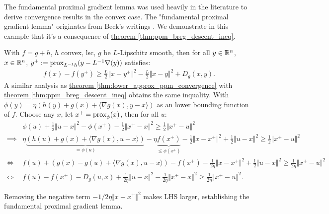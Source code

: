\documentclass[12pt]{article}
\begin{document}
        \begin{example}
            The fundamental proximal gradient lemma was used heavily in the literature to derive convergence results in the convex case. 
            The "fundamental proximal gradient lemma" originates from Beck's writings \cite[theorem 10.16]{beck_first-order_nodate}. 
            We demonstrate in this example that it's a consequence of \hyperref[thm:ppm_breg_descent_ineq]{theorem \ref*{thm:ppm_breg_descent_ineq}}. 
            \par
            With $f = g + h$, $h$ convex, lsc, $g$ be $L$-Lipschitz smooth, then for all $y\in \mathbb R^n$, $x\in \mathbb R^n$, $y^+ := \operatorname{prox}_{L^{-1}h}(y - L^{-1}\nabla (y))$ satisfies: 
            \begin{align*}
                f(x) - f(y^+) \ge \frac{L}{2}\Vert x - y^+\Vert^2 - \frac{L}{2}\Vert x - y\Vert^2 + D_g(x, y).
            \end{align*}
            A similar analysis as \hyperref[thm:lower_approx_ppm_convergence]{ theorem \ref*{thm:lower_approx_ppm_convergence}} with \hyperref[thm:ppm_breg_descent_ineq]{theorem \ref*{thm:ppm_breg_descent_ineq}} obtains the same inquality. 
            With $\phi(y) = \eta(h(y) + g(x) + \langle \nabla g(x), y - x\rangle)$ as an lower bounding function of $f$. 
            Choose any $x$, let $x^+ = \operatorname{prox}_\phi(x)$, then for all $u$:
            {\small
            \begin{align*}
                & \phi(u) + \frac{1}{2}\Vert u - x\Vert^2 - \phi(x^+) - \frac{1}{2}\Vert x^+ - x\Vert^2 
                \ge \frac{1}{2}\Vert x^+ - u\Vert^2
                \\
                \implies &
                \eta\underbrace{
                    \left(
                        h(u) + g(x) + \langle \nabla g(x), u - x\rangle 
                    \right)
                }_{= \phi(u)} 
                - \eta \underbrace{f(x^+)}_{\le \phi(x^+)} - \frac{1}{2}\Vert x - x^+\Vert^2 
                + \frac{1}{2} \Vert u - x\Vert^2 
                \ge 
                \frac{1}{2}\Vert x^+ - u\Vert^2 
                \\
                \iff & 
                f(u) + \left(
                    g(x) - g(u) + \langle \nabla g(x), u -x\rangle 
                \right)
                - f(x^+) - \frac{1}{2\eta}\Vert x - x^+\Vert^2
                + 
                \frac{1}{2}\Vert u - x\Vert^2 
                \ge 
                \frac{1}{2\eta}\Vert x^+ - u\Vert^2 
                \\
                \iff 
                & f(u) - f(x^+) - D_g(u, x)
                + \frac{1}{2\eta} \Vert u - x\Vert^2 - \frac{1}{2\eta}\Vert x^+ - x\Vert^2
                \ge 
                \frac{1}{2\eta} \Vert x^+ - u\Vert^2. 
            \end{align*}
            }
            \par\noindent
            Removing the negative term $-1/2\eta \Vert x - x^+\Vert^2$ makes LHS larger, establishing the fundamental proximal gradient lemma. 
        \end{example}
\end{document}
